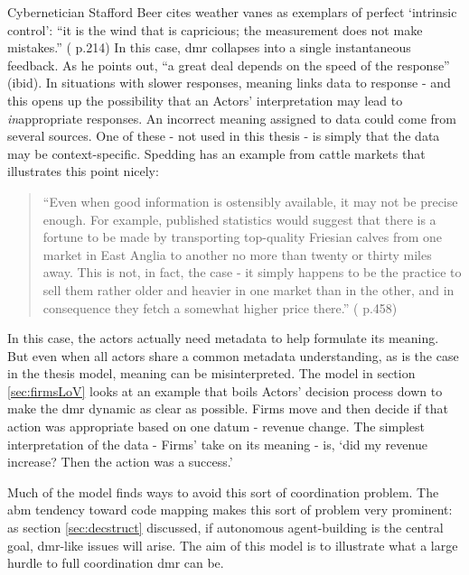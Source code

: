 {Cybernetician Stafford Beer cites weather vanes as exemplars of perfect `intrinsic control': ``it is the wind that is capricious; the measurement does not make mistakes.'' (\citealt{beer_what_2002} p.214) In this case, \gls{dmr} collapses into a single instantaneous feedback. As he points out, ``a great deal depends on the speed of the response'' (ibid). In situations with slower responses, meaning links data to response - and this opens up the possibility that an Actors' interpretation may lead to \emph{in}appropriate responses. An incorrect meaning assigned to data could come from several sources. One of these - not used in this thesis - is simply that the data may be context-specific. Spedding has an example from cattle markets that illustrates this point nicely: 

\begin{quote}
``Even when good information is ostensibly available, it may not be precise enough. For example, published statistics would suggest that there is a fortune to be made by transporting top-quality Friesian calves from one market in East Anglia to another no more than twenty or thirty miles away. This is not, in fact, the case - it simply happens to be the practice to sell them rather older and heavier in one market than in the other, and in consequence they fetch a somewhat higher price there.'' (\citealt{spedding_freams_1983} p.458)
\end{quote}

In this case, the actors actually need metadata to help formulate its meaning. But even when all actors share a common metadata understanding, as is the case in the thesis model, meaning can be misinterpreted. The model in section \ref{sec:firmsLoV} looks at an example that boils Actors' decision process down to make the \gls{dmr} dynamic as clear as possible. Firms move and then decide if that action was appropriate based on one datum - revenue change. The simplest interpretation of the data - Firms' take on its meaning - is, `did my revenue increase? Then the action was a success.' 

Much of the model finds ways to avoid this sort of coordination problem. The \gls{abm} tendency toward code mapping makes this sort of problem very prominent: as section \ref{sec:decstruct} discussed, if autonomous agent-building is the central goal, \gls{dmr}-like issues will arise. The aim of this model  is to illustrate what a large hurdle to full coordination \gls{dmr} can be.


}
